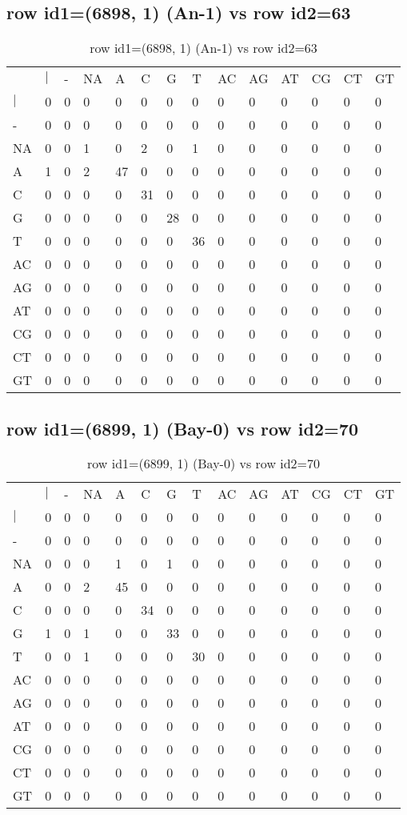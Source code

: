 \subsection{row id1=(6898, 1) (An-1) vs row id2=63}
\begin{center}
\begin{longtable}{|l|l|l|l|l|l|l|l|l|l|l|l|l|l|}
\caption{row id1=(6898, 1) (An-1) vs row id2=63} \label{table_dm62}\\
\hline
\\
\hline
&$|$&-&NA&A&C&G&T&AC&AG&AT&CG&CT&GT\\
$|$&0&0&0&0&0&0&0&0&0&0&0&0&0\\
-&0&0&0&0&0&0&0&0&0&0&0&0&0\\
NA&0&0&1&0&2&0&1&0&0&0&0&0&0\\
A&1&0&2&47&0&0&0&0&0&0&0&0&0\\
C&0&0&0&0&31&0&0&0&0&0&0&0&0\\
G&0&0&0&0&0&28&0&0&0&0&0&0&0\\
T&0&0&0&0&0&0&36&0&0&0&0&0&0\\
AC&0&0&0&0&0&0&0&0&0&0&0&0&0\\
AG&0&0&0&0&0&0&0&0&0&0&0&0&0\\
AT&0&0&0&0&0&0&0&0&0&0&0&0&0\\
CG&0&0&0&0&0&0&0&0&0&0&0&0&0\\
CT&0&0&0&0&0&0&0&0&0&0&0&0&0\\
GT&0&0&0&0&0&0&0&0&0&0&0&0&0\\
\hline
\end{longtable}
\end{center}

\subsection{row id1=(6899, 1) (Bay-0) vs row id2=70}
\begin{center}
\begin{longtable}{|l|l|l|l|l|l|l|l|l|l|l|l|l|l|}
\caption{row id1=(6899, 1) (Bay-0) vs row id2=70} \label{table_dm64}\\
\hline
\\
\hline
&$|$&-&NA&A&C&G&T&AC&AG&AT&CG&CT&GT\\
$|$&0&0&0&0&0&0&0&0&0&0&0&0&0\\
-&0&0&0&0&0&0&0&0&0&0&0&0&0\\
NA&0&0&0&1&0&1&0&0&0&0&0&0&0\\
A&0&0&2&45&0&0&0&0&0&0&0&0&0\\
C&0&0&0&0&34&0&0&0&0&0&0&0&0\\
G&1&0&1&0&0&33&0&0&0&0&0&0&0\\
T&0&0&1&0&0&0&30&0&0&0&0&0&0\\
AC&0&0&0&0&0&0&0&0&0&0&0&0&0\\
AG&0&0&0&0&0&0&0&0&0&0&0&0&0\\
AT&0&0&0&0&0&0&0&0&0&0&0&0&0\\
CG&0&0&0&0&0&0&0&0&0&0&0&0&0\\
CT&0&0&0&0&0&0&0&0&0&0&0&0&0\\
GT&0&0&0&0&0&0&0&0&0&0&0&0&0\\
\hline
\end{longtable}
\end{center}

